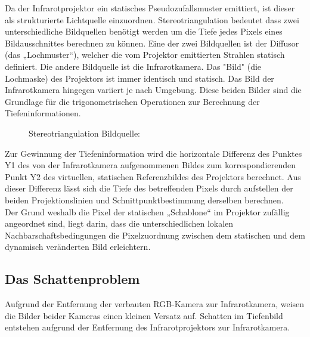 Da der Infrarotprojektor ein statisches Pseudozufallsmuster emittiert, ist dieser als strukturierte Lichtquelle einzuordnen.
Stereotriangulation bedeutet dass zwei unterschiedliche Bildquellen benötigt werden um die Tiefe jedes Pixels eines Bildausschnittes berechnen zu können.
Eine der zwei Bildquellen ist der Diffusor (das „Lochmuster“), welcher die vom Projektor emittierten Strahlen statisch definiert. Die andere Bildquelle ist die Infrarotkamera.
Das "Bild" (die Lochmaske) des Projektors ist immer identisch und statisch. Das Bild der Infrarotkamera hingegen variiert je nach Umgebung. Diese beiden Bilder sind die Grundlage für die trigonometrischen Operationen zur Berechnung der Tiefeninformationen.

\begin{figure}[!ht]
  \centering
   \caption{ Stereotriangulation Bildquelle:\cite{stereotriangluation}}
\end{figure}
Zur Gewinnung der Tiefeninformation wird die horizontale Differenz des Punktes Y1 des von der Infrarotkamera aufgenommenen Bildes zum korrespondierenden Punkt Y2 des virtuellen, statischen Referenzbildes des Projektors berechnet. Aus dieser Differenz lässt sich die Tiefe des betreffenden Pixels durch aufstellen der beiden Projektionslinien und Schnittpunktbestimmung derselben berechnen. \\
Der Grund weshalb die Pixel der statischen „Schablone“ im Projektor zufällig angeordnet sind, liegt darin, dass die unterschiedlichen lokalen Nachbarschaftsbedingungen die Pixelzuordnung zwischen dem statischen und dem dynamisch veränderten Bild erleichtern.


\subsection{Das Schattenproblem}

Aufgrund der Entfernung der verbauten RGB-Kamera zur Infrarotkamera, weisen die Bilder beider Kameras einen kleinen Versatz auf.
Schatten im Tiefenbild entstehen aufgrund der Entfernung des Infrarotprojektors zur Infrarotkamera.


